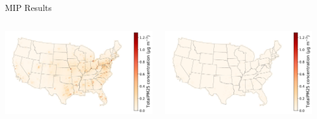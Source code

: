 \documentclass{beamer}
\begin{document}
\begin{frame}{MIP Results}
    \begin{columns} %
        \centering
        \includegraphics[width=\linewidth]{Figures/Output/full-base-200/GenX/ISRM_2027_TotalPM25_concentrationmap.jpg}

        \centering
        \includegraphics[width=\linewidth]{Figures/Output/full-base-200/GenX/ISRM_2050_TotalPM25_concentrationmap.jpg}
    \end{columns}
\end{frame}
\end{document}
